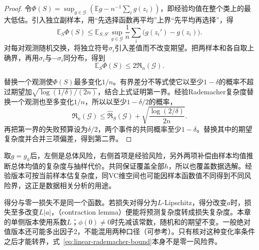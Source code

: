 \begin{proof}
令$\Phi(S)=\sup_{g\in\mathcal G}(\mathbb E g-n^{-1}\sum_i g(z_i))$，即经验均值在整个类上的最大低估。引入独立副样本，用“先选择函数再平均”上界“先平均再选择”，得
\[
 \mathbb E_S\Phi(S)
 \leq\mathbb E_{S,S'}\sup_{g\in\mathcal G}
 \frac1n\sum_i\bigl(g(z_i')-g(z_i)\bigr).
\]
对每对观测随机交换，将独立符号$\sigma_i$引入差值而不改变期望。把两样本和各自取上确界，再用$\sigma_i$与$-\sigma_i$同分布，得到
\begin{equation}
 \mathbb E_S\Phi(S)\leq2\mathfrak R_n(\mathcal G).
 \label{eq:rademacher-symmetrization}
\end{equation}

替换一个观测使$\Phi(S)$最多变化$1/n$。有界差分不等式使它以至少$1-\delta$的概率不超过期望加$\sqrt{\log(1/\delta)/(2n)}$，结合上式证明第一界。经验Rademacher复杂度替换一个观测也至多变化$1/n$，所以以至少$1-\delta/2$的概率，
\[
 \mathfrak R_n(\mathcal G)
 \leq\widehat{\mathfrak R}_S(\mathcal G)
 +\sqrt{\frac{\log(2/\delta)}{2n}}.
\]
再把第一界的失败预算设为$\delta/2$，两个事件的共同概率至少$1-\delta$。替换其中的期望复杂度并合并三项偏差，得到第二界。
\end{proof}

取$g=g_h$后，左侧是总体风险，右侧首项是经验风险，另外两项补偿由样本均值推断总体均值的复杂度与抽样代价。共同保证覆盖全部$h$，所以也覆盖数据选解。经验版本可按当前样本估复杂度，同VC维空间也可能因样本函数值不同得到不同风险界，这正是数据相关分析的用途。

得分与零一损失不是同一个函数。若损失对得分为$L$-Lipschitz，得分改变$a$时，损失至多改变$L|a|$，（contraction lemma）便能将预测复杂度转成损失复杂度。本章的单侧版本使用系数$L$；$\phi(0)\neq0$时先减该常数，随机和的期望不变。一般绝对值版本还可能多出因子2，不能混用两种口径（可参考）。只有核对这种变化率条件之后才能转界，式~\eqref{eq:linear-rademacher-bound}本身不是零一风险界。

